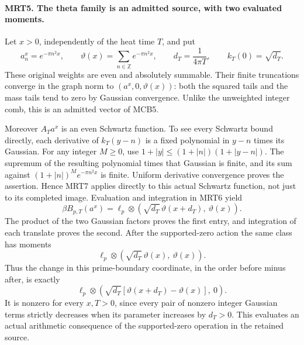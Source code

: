 \paragraph{MRT5. The theta family is an admitted source, with two evaluated moments.}
Let \(x>0\), independently of the heat time \(T\), and put
\[
 a^{x}_n=e^{-\pi n^2x},\qquad
 \vartheta(x)=\sum_{n\in\mathbb Z}e^{-\pi n^2x},\qquad
 d_T=\frac1{4\pi T},\qquad k_T(0)=\sqrt{d_T}.             \tag{MRT13}
\]
These original weights are even and absolutely summable. Their
finite truncations converge in the graph norm to
\((a^x,0,\vartheta(x))\): both the squared tails and the mass
tails tend to zero by Gaussian convergence. Unlike the unweighted
integer comb, this is an admitted vector of MCB5.

Moreover \(A_Ta^x\) is an even Schwartz function. To see every
Schwartz bound directly, each derivative of \(k_T(y-n)\) is a
fixed polynomial in \(y-n\) times its Gaussian. For any integer
\(M\ge0\), use
\(1+|y|\le(1+|n|)(1+|y-n|)\). The supremum of the resulting
polynomial times that Gaussian is finite, and its sum against
\((1+|n|)^M e^{-\pi n^2x}\) is finite. Uniform derivative
convergence proves the assertion. Hence MRT7 applies directly
to this actual Schwartz function, not just to its completed image.
Evaluation and integration in MRT6 yield
\[
 \beta B_{p,T}(a^x)=
 \ell_p\otimes\left(
    \sqrt{d_T}\,\vartheta(x+d_T),\ \vartheta(x)\right).
                                                               \tag{MRT14}
\]
The product of the two Gaussian factors proves the first entry,
and integration of each translate proves the second. After the
supported-zero action the same class has moments
\[
 \ell_p\otimes\left(
     \sqrt{d_T}\,\vartheta(x),\ \vartheta(x)\right).       \tag{MRT15}
\]
Thus the change in this prime-boundary coordinate, in the order
before minus after, is exactly
\[
 \ell_p\otimes\left(
   \sqrt{d_T}[\vartheta(x+d_T)-\vartheta(x)],\ 0\right).
                                                               \tag{MRT16}
\]
It is nonzero for every \(x,T>0\), since every pair of nonzero
integer Gaussian terms strictly decreases when its parameter
increases by \(d_T>0\). This evaluates an actual arithmetic
consequence of the supported-zero operation in the retained source.

